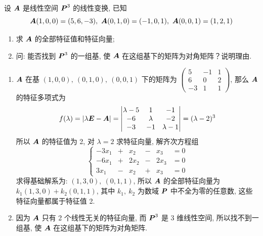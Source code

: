 \begin{example}
    设 $\vb*{A}$ 是线性空间 $\vb*{P}^3$ 的线性变换, 已知
    $$\vb*{A}(1,0,0)=(5,6,-3),~\vb*{A}(0,1,0)=(-1,0,1),~\vb*{A}(0,0,1)=(1,2,1)$$
    \begin{enumerate}[label=(\arabic{*})]
        \item 求 $\vb*{A}$ 的全部特征值和特征向量;
        \item 问: 能否找到 $\vb*{P}^3$ 的一组基, 使 $\vb*{A}$ 在这组基下的矩阵为对角矩阵？说明理由.
    \end{enumerate}
\end{example}
\begin{solution}
    \begin{enumerate}[label=(\arabic{*})]
        \item $\vb*{A}$ 在基 $(1,0,0),~(0,1,0),~(0,0,1)$ 下的矩阵为
              $\begin{pmatrix}
                      5  & -1 & 1 \\
                      6  & 0  & 2 \\
                      -3 & 1  & 1
                  \end{pmatrix}$, 那么 $\vb*{A}$ 的特征多项式为
              $$f(\lambda)=|\lambda\vb*{E}-\vb*{A}|=\begin{vmatrix}
                      \lambda -5 & 1       & -1         \\
                      -6         & \lambda & -2         \\
                      -3         & -1      & \lambda -1
                  \end{vmatrix}\xlongequal[]{}(\lambda-2)^3$$
              所以 $\vb*{A}$ 的特征值为 2, 对 $\lambda=2$ 求特征向量, 解齐次方程组
              $$\left\{\begin{matrix}
                      -3x_1 & + & x_2  & - & x_3  & =0 \\
                      -6x_1 & + & 2x_2 & - & 2x_3 & =0 \\
                      3x_1  & - & x_2  & + & x_3  & =0
                  \end{matrix}\right.$$
              求得基础解系为: $(1,3,0),~(0,1,1)$, 所以 $\vb*{A}$ 的全部特征向量为 $k_1(1,3,0)+k_2(0,1,1)$, 其中 $k_1,~k_2$ 为数域 $\vb*{P}$
              中不全为零的任意数, 这些特征向量都属于特征值 2.
        \item 因为 $\vb*{A}$ 只有 2 个线性无关的特征向量, 而 $\vb*{P}^3$ 是 3 维线性空间, 所以找不到一组基, 使 $\vb*{A}$ 在这组基下的矩阵为对角矩阵.
    \end{enumerate}
\end{solution}

